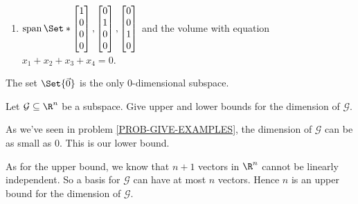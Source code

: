 \begin{exercises}
\begin{problist}
\begin{solution}
\begin{enumerate}[label=(\roman*)]
				\item $\Span\Set*{\mat{1\\0\\0\\0},\mat{0\\1\\0\\0},\mat{0\\0\\1\\0}}$ and the volume with equation $x_1+x_2+x_3+x_4=0$.
			\end{enumerate}

			The set $\Set{\vec 0}$ is the only 0-dimensional subspace.
		\end{solution}

		\prob Let $\mathcal G\subseteq \R^n$ be a subspace.
		Give upper and lower bounds for the dimension of $\mathcal G$.
		\begin{solution}
			As we've seen in problem \ref{PROB-GIVE-EXAMPLES}, the dimension of $\mathcal G$ can be as small as $0$. This is our lower bound.

			As for the upper bound, we know that $n+1$ vectors in $\R^n$ cannot be linearly independent. So a basis for $\mathcal G$ can have at most $n$ vectors. Hence $n$ is an upper bound for the dimension of $\mathcal G$.
		\end{solution}
	\end{problist}
\end{exercises}
